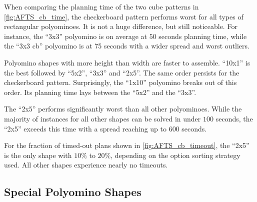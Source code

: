 When comparing the planning time of the two cube patterns in \autoref{fig:AFTS_cb_time}, the checkerboard pattern performs worst for all types of rectangular polyominoes.
It is not a huge difference, but still noticeable.
For instance, the ``3x3'' polyomino is on average at $50$ seconds planning time, while the ``3x3 cb'' polyomino is at 75 seconds with a wider spread and worst outliers.

Polyomino shapes with more height than width are faster to assemble.
``10x1'' is the best followed by ``5x2'', ``3x3'' and ``2x5''.
The same order persists for the checkerboard pattern.
Surprisingly, the ``1x10'' polyomino breaks out of this order.
Its planning time lays between the ``5x2'' and the ``3x3''.

The ``2x5'' performs significantly worst than all other polyominoes.
While the majority of instances for all other shapes can be solved in under $100$ seconds, the ``2x5'' exceeds this time with a spread reaching up to $600$ seconds.

For the fraction of timed-out plans shown in \autoref{fig:AFTS_cb_timeout}, the ``2x5'' is the only shape with $10\%$ to $20\%$, depending on the option sorting strategy used.
All other shapes experience nearly no timeouts.

\subsection{Special Polyomino Shapes}
\label{sec:special_poly}

